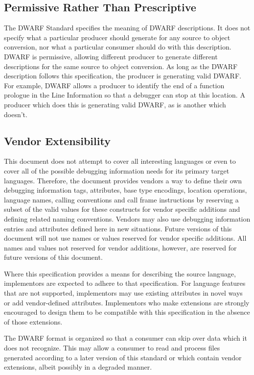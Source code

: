 \subsection{Permissive Rather Than Prescriptive}
\eb
The DWARF Standard specifies the meaning of DWARF descriptions.  
It does not specify what a particular producer should generate 
for any source to object conversion, nor what a particular 
consumer should do with this description.  DWARF is permissive, 
allowing different producer to generate different descriptions 
for the same source to object conversion.  As long as the DWARF 
description follows this specification, the producer is 
generating valid DWARF.
For example, DWARF allows 
\bb
a producer 
\eb
to identify the end of a 
function prologue in the Line Information so that a debugger 
can stop at this location.  A producer which does this is 
generating valid DWARF, as is another which doesn't.  

\subsection{Vendor Extensibility}
This document does not attempt to cover all interesting
languages or even to cover all of the possible debugging
information needs for its primary target languages. 
Therefore,
the document provides vendors a way to define their own
debugging information tags, attributes, base type encodings,
location operations, language names, calling conventions and
call frame instructions by reserving a subset of the valid
values for these constructs for vendor specific additions
and defining related naming conventions. 
Vendors may also use
debugging information entries and attributes defined here in
new situations. 
Future versions of this document will not use
names or values reserved for vendor specific additions. 
All
names and values not reserved for vendor additions, however,
are reserved for future versions of this document.

Where this specification provides a means for
describing the source language, implementors are expected
to adhere to that specification. 
For language features that
are not supported, implementors may use existing attributes
in novel ways or add vendor-defined attributes. 
Implementors
who make extensions are strongly encouraged to design them
to be compatible with this specification in the absence of
those extensions.

The DWARF format is organized so that a consumer can skip over
data which it does not recognize. 
This may allow a consumer
to read and process files generated according to a later
version of this standard or which contain vendor extensions,
albeit possibly in a degraded manner.

